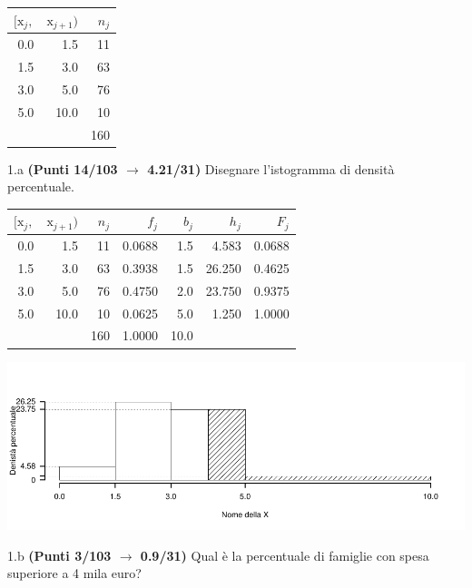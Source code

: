 \documentclass[
  11pt,
]{book}
\theoremstyle{mytheoremstyle}
\theoremstyle{mydefstyle}
\newenvironment{sol}
  {
  \begin{tcolorbox}[enhanced,breakable,arc=0.1mm,boxrule=1pt,colback=white,colframe=iblue,
  title=\bf \fontfamily{lmss}\selectfont \hspace{.5 cm} Soluzione,drop fuzzy shadow]

}{
\end{tcolorbox}
  }
\begin{document}
\begin{table}[H]
\centering
\begin{tabular}{rrr}
\toprule
$[\text{x}_j,$ & $\text{x}_{j+1})$ & $n_j$\\
\midrule
0.0 & 1.5 & 11\\
1.5 & 3.0 & 63\\
3.0 & 5.0 & 76\\
5.0 & 10.0 & 10\\
 &  & 160\\
\bottomrule
\end{tabular}
\end{table}

1.a \textbf{(Punti 14/103 \(\rightarrow\) 4.21/31)} Disegnare l'istogramma di densità percentuale.

\begin{sol}

\begin{table}[H]
\centering
\begin{tabular}{rrrrrrr}
\toprule
$[\text{x}_j,$ & $\text{x}_{j+1})$ & $n_j$ & $f_j$ & $b_j$ & $h_j$ & $F_j$\\
\midrule
0.0 & 1.5 & 11 & 0.0688 & 1.5 & 4.583 & 0.0688\\
1.5 & 3.0 & 63 & 0.3938 & 1.5 & 26.250 & 0.4625\\
3.0 & 5.0 & 76 & 0.4750 & 2.0 & 23.750 & 0.9375\\
5.0 & 10.0 & 10 & 0.0625 & 5.0 & 1.250 & 1.0000\\
 &  & 160 & 1.0000 & 10.0 &  & \\
\bottomrule
\end{tabular}
\end{table}

\begin{center}\includegraphics{Esami_passati_con_soluzioni_files/figure-latex/2023-165-1} \end{center}

\end{sol}

1.b \textbf{(Punti 3/103 \(\rightarrow\) 0.9/31)} Qual è la percentuale di famiglie con spesa superiore a 4 mila euro?
\end{document}
